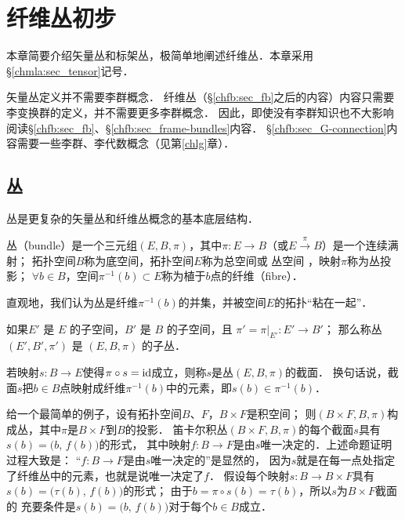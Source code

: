 
\chapter{纤维丛初步}\label{chfb}

本章简要介绍矢量丛和标架丛，极简单地阐述纤维丛．本章采用\S\ref{chmla:sec_tensor}记号．

矢量丛定义并不需要李群概念．
纤维丛（\S\ref{chfb:sec_fb}之后的内容）内容只需要李变换群的定义，并不需要更多李群概念．
因此，即使没有李群知识也不大影响阅读\S\ref{chfb:sec_fb}、\S\ref{chfb:sec_frame-bundles}内容．
\S\ref{chfb:sec_G-connection}内容需要一些李群、李代数概念（见第\ref{chlg}章）．

\section{丛}
丛是更复杂的矢量丛和纤维丛概念的基本底层结构．

\begin{definition}
    {\heiti 丛}（bundle）是一个三元组$(E, B, \pi)$，其中$\pi: E\to B$（或$E\xrightarrow{\pi} B$）是一个连续满射；
    拓扑空间$B$称为{\heiti 底空间}，拓扑空间$E$称为{\heiti 总空间}或 {\heiti 丛空间} ，映射$\pi$称为{\heiti 丛投影}；
    $\forall b\in B$，空间$\pi^{-1}(b)\subset E$称为植于$b$点的{\heiti 纤维}（fibre）．
\end{definition}
直观地，我们认为丛是纤维$\pi^{-1}(b)$的并集，并被空间$E$的拓扑“粘在一起”．


\begin{definition}
     如果$E'$ 是 $E$ 的子空间，$B'$ 是 $B$ 的子空间，且 $ \pi' = \pi |_{E'}: E'\to B'$；
     那么称丛 $(E',  B',\pi')$ 是 $(E, B,\pi)$ 的{\heiti 子丛}．
\end{definition}

\begin{definition}
    若映射$s: B\to E$使得$\pi \circ s = {\rm id}$成立，则称$s$是丛$(E, B,\pi)$的{\heiti 截面}．
    换句话说，截面$s$把$b\in B$点映射成纤维$\pi^{-1}(b)$中的元素，即$s(b)\in \pi^{-1}(b)$．
\end{definition}
    


给一个最简单的例子，设有拓扑空间$B$、$F$，$B\times F$是积空间；
则$(B\times F, B,\pi)$构成丛，其中$\pi$是$B\times F$到$B$的投影．
笛卡尔积丛$(B \times F, B,\pi)$的每个截面$s$具有$s(b) = \bigl(b,\, f(b)\bigr)$的形式，
其中映射$f: B\to F$是由$s$唯一决定的．上述命题证明过程大致是：
“$f: B\to F$是由$s$唯一决定的”是显然的，
因为$s$就是在每一点处指定了纤维丛中的元素，也就是说唯一决定了$f$．
假设每个映射$s: B\to B\times F$具有$s(b) = \bigl(\tau(b), \, f (b)\bigr)$的形式；
由于$b=\pi \circ s(b) = \tau(b)$，所以$s$为$B\times F$截面的
充要条件是$s(b) = \bigl(b,\, f(b)\bigr)$对于每个$b\in B$成立．

